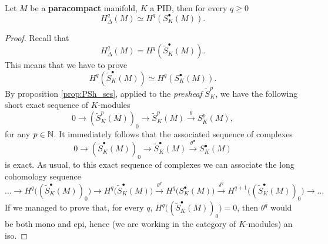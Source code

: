 \begin{thm}\label{thm:iso_cohomologies}
	Let $M$ be a \textbf{paracompact} manifold, $K$ a PID, then for every $q \geq 0$ 
	\begin{equation}
		H^q_\Delta(M) \simeq H^q \left( S^\bullet_K(M) \right)
	.\end{equation} 
\end{thm}
\begin{proof}
	Recall that 
	\begin{equation}
		H^q_\Delta(M) = H^q(\widetilde{S}_K^\bullet(M))
	.\end{equation} 
	This means that we have to prove
	\begin{equation}
		H^q(\widetilde{S}_K^\bullet(M))\simeq H^q \left( S^\bullet_K(M)\right)
	.\end{equation} 
	By proposition \ref{prop:PSh_ses}, applied to the \textit{presheaf} $\widetilde{S}^p_K$, we have the following short exact sequence of $K$-modules
	\begin{equation}
		0 \to (\widetilde{S}^p_K(M))_0 \to \widetilde{S}^p_K(M) \xrightarrow{\theta} S^p_K(M)
	,\end{equation} 
	for any $p \in \mathbb{N}$.
	It immediately follows that the associated sequence of complexes
	\begin{equation}
		0 \to (\widetilde{S}^\bullet_K(M))_0 \to \widetilde{S}^\bullet_K(M) \xrightarrow{\theta^\bullet} S^\bullet_K(M)
	\end{equation} 
	is exact.
	As usual, to this exact sequence of complexes we can associate the long cohomology sequence
	\begin{equation}
		\dots \to H^q\big((\widetilde{S}^\bullet_K(M))_0\big) \to H^q\big(\widetilde{S}^\bullet_K(M)\big) \xrightarrow{\theta^q} H^q \big(S^\bullet_K(M)\big) \xrightarrow{\delta^q} H^{q+1}\big((\widetilde{S}^\bullet_K(M))_0\big) \to \dots
	\end{equation} 
	If we managed to prove that, for every $q$, $H^q \big( (\widetilde{S}^\bullet_K(M))_0 \big) = 0$, then $\theta^q$ would be both mono and epi, hence (we are working in the category of $K$-modules) an iso.


\end{proof}
